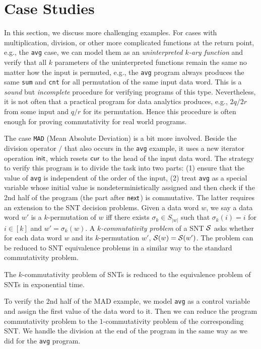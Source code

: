 \section{Case Studies}
\label{sec:cases}



In this section, we discuss more challenging examples. 
For cases with multiplication, division, or other more complicated functions at the return point, e.g., the \texttt{avg} case, we can model them as an \emph{uninterpreted $k$-ary function} and verify that all $k$ parameters of the uninterpreted functions remain the same no matter how the input is permuted, e.g., the \texttt{avg} program always produces the same \texttt{sum} and \texttt{cnt} for all permutation of the same input data word. This is a \emph{sound} but \emph{incomplete} procedure for verifying programs of this type. Nevertheless, it is not often that a  practical program for data analytics produces, e.g., $2q/2r$ from some input and $q/r$ for its permutation. Hence this procedure is often enough for proving commutativity for real world programs.

The case \texttt{MAD} (Mean Absolute Deviation) is a bit more involved. Beside the division operator $/$ that also occurs in the \texttt{avg} example, it uses a new iterator operation $\mathsf{init}$, which resets $\mathsf{cur}$ to the head of the input data word. The strategy to verify this program is to divide the task into two parts: (1) ensure that the value of \texttt{avg} is independent of the order of the input, (2) treat \texttt{avg} as a special variable whose initial value is nondeterministically assigned and then check if the 2nd half of the program (the part after $\mathsf{next}$) is commutative. The latter requires an extension to the SNT decision problems. Given a data word $w$, we say a data word $w'$ is a $k$-permutation of $w$ iff there exists $\sigma_k\in S_{|w|}$ such that $\sigma_k(i)=i$ for $i \in [k]$ and $w'=\sigma_k(w)$. A \emph{$k$-commutativity problem} of a SNT ${\mathcal{S} }$ asks whether for each data word $w$ and its $k$-permutation $w'$, ${\mathcal{S} }(w)={\mathcal{S} }(w')$. The problem can be reduced to SNT equivalence problems in a similar way to the standard commutativity problem.

\begin{proposition}\label{prop-snt-kcmm-to-eqv}
	The $k$-commutativity problem of SNTs is reduced to the equivalence problem of SNTs in exponential time. 
\end{proposition}

To verify the 2nd half of the MAD example, we model \texttt{avg} as a control variable and assign the first value of the data word to it. Then we can reduce the program commutativity problem to the $1$-commutativity problem of the corresponding SNT. We handle the division at the end of the program in the same way as we did for the \texttt{avg} program.


